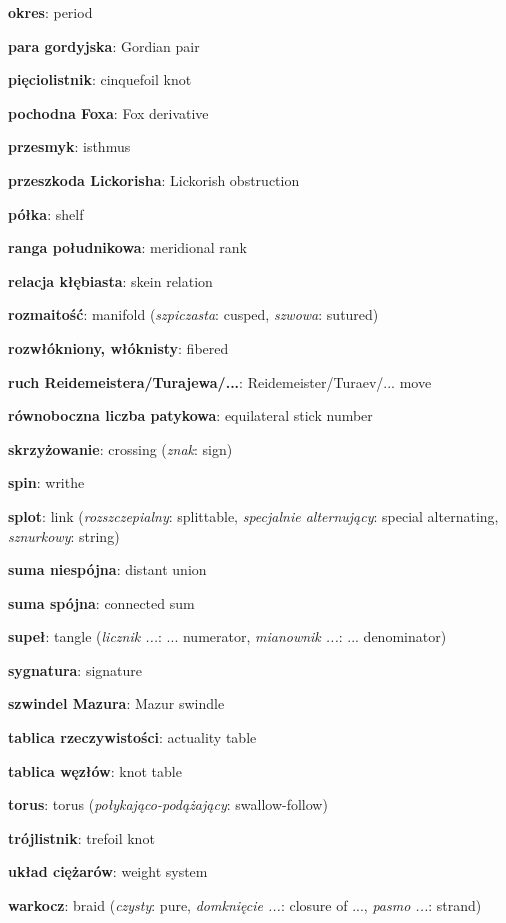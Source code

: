 \item \textbf{okres}: period
\item \textbf{para gordyjska}: Gordian pair
\item \textbf{pięciolistnik}: cinquefoil knot
\item \textbf{pochodna Foxa}: Fox derivative
\item \textbf{przesmyk}: isthmus
\item \textbf{przeszkoda Lickorisha}: Lickorish obstruction
\item \textbf{półka}: shelf
\item \textbf{ranga południkowa}: meridional rank
\item \textbf{relacja kłębiasta}: skein relation
\item \textbf{rozmaitość}: manifold
(\emph{szpiczasta}: cusped, \emph{szwowa}: sutured)
\item \textbf{rozwłókniony, włóknisty}: fibered
\item \textbf{ruch Reidemeistera/Turajewa/...}: Reidemeister/Turaev/... move
\item \textbf{równoboczna liczba patykowa}: equilateral stick number
\item \textbf{skrzyżowanie}: crossing
(\emph{znak}: sign)
\item \textbf{spin}: writhe
\item \textbf{splot}: link
(\emph{rozszczepialny}: splittable, \emph{specjalnie alternujący}: special alternating, \emph{sznurkowy}: string)
\item \textbf{suma niespójna}: distant union
\item \textbf{suma spójna}: connected sum
\item \textbf{supeł}: tangle
(\emph{licznik ...}: ... numerator, \emph{mianownik ...}: ... denominator)
\item \textbf{sygnatura}: signature
\item \textbf{szwindel Mazura}: Mazur swindle
\item \textbf{tablica rzeczywistości}: actuality table
\item \textbf{tablica węzłów}: knot table
\item \textbf{torus}: torus
(\emph{połykająco-podążający}: swallow-follow)
\item \textbf{trójlistnik}: trefoil knot
\item \textbf{układ ciężarów}: weight system
\item \textbf{warkocz}: braid
(\emph{czysty}: pure, \emph{domknięcie ...}: closure of ..., \emph{pasmo ...}: strand)
